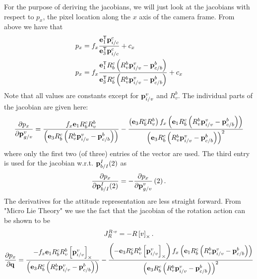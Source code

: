 For the purpose of deriving the jacobians, we will just look at the jacobians
with respect to $p_x$, the pixel location along the $x$ axis of the camera
frame. From above we have that
\begin{align}
  p_x &= f_x \frac{\boldsymbol{\mathrm{e}}_1^{\mathsf{T}} \boldsymbol{\mathrm{p}}_{i/c}^c}{\boldsymbol{\mathrm{e}}_3^{\mathsf{T}} \boldsymbol{\mathrm{p}}_{i/c}^c} + c_x \\ 
  p_x &= f_x \frac{\boldsymbol{\mathrm{e}}_1^{\mathsf{T}} R_b^c \left(R_v^b \boldsymbol{\mathrm{p}}_{i/v}^v -
      \boldsymbol{\mathrm{p}}_{c/b}^b\right) }{\boldsymbol{\mathrm{e}}_3^{\mathsf{T}} R_b^c \left(R_v^b \boldsymbol{\mathrm{p}}_{i/v}^v -
  \boldsymbol{\mathrm{p}}_{c/b}^b\right) } + c_x 
\end{align}
Note that all values are constants except for $\boldsymbol{\mathrm{p}}_{i/v}^v$ and $R_v^b$.
The individual parts of the jacobian are given here:
\begin{equation}
  \frac{\partial p_x}{\partial \boldsymbol{\mathrm{p}}_{g/v}^v} =
  \frac{f_x \boldsymbol{\mathrm{e}}_1 R_b^c R_v^b}
    {\left(\boldsymbol{\mathrm{e}}_3 R_b^c \left(R_v^b \boldsymbol{\mathrm{p}}_{i/v}^v -
    \boldsymbol{\mathrm{p}}_{c/b}^b\right)\right)}
    - \frac{\left(\boldsymbol{\mathrm{e}}_3 R_b^c R_v^b \right) f_x \left(\boldsymbol{\mathrm{e}}_1 R_b^c \left(R_v^b \boldsymbol{\mathrm{p}}_{i/v}^v -
        \boldsymbol{\mathrm{p}}_{c/b}^b\right)\right)} {\left(\boldsymbol{\mathrm{e}}_3 R_b^c \left(R_v^b \boldsymbol{\mathrm{p}}_{i/v}^v -
  \boldsymbol{\mathrm{p}}_{c/b}^b\right)\right)^2}
\end{equation}
where only the first two (of three) entries of the vector are used. The third
entry is used for the jacobian w.r.t. $\boldsymbol{\mathrm{p}}_{b/I}^I(2)$ as
\begin{equation}
  \frac{\partial p_x}{\partial \boldsymbol{\mathrm{p}}_{b/I}^I(2)} = -\frac{\partial p_x}{\partial
  \boldsymbol{\mathrm{p}}_{g/v}^v}\left(2\right).
\end{equation}
The derivatives for the attitude representation are less straight forward. From
"Micro Lie Theory" we use the fact that the jacobian of the rotation action can
be shown to be
\begin{equation}
  J_R^{R \cdot v} = -R \left[ v \right]_{\times}.
\end{equation}
\begin{equation}
  \frac{\partial p_x}{\partial \boldsymbol{\mathrm{q}}} =
  \frac{-f_x \boldsymbol{\mathrm{e}}_1 R_b^c R_v^b \left[ \boldsymbol{\mathrm{p}}_{i/v}^v \right]_{\times}}
    {\left(\boldsymbol{\mathrm{e}}_3 R_b^c \left(R_v^b \boldsymbol{\mathrm{p}}_{i/v}^v -
    \boldsymbol{\mathrm{p}}_{c/b}^b\right)\right)}
    - \frac{\left(-\boldsymbol{\mathrm{e}}_3 R_b^c R_v^b \left[ \boldsymbol{\mathrm{p}}_{i/v}^v \right]_{\times} \right) f_x \left(\boldsymbol{\mathrm{e}}_1 R_b^c \left(R_v^b \boldsymbol{\mathrm{p}}_{i/v}^v -
        \boldsymbol{\mathrm{p}}_{c/b}^b\right)\right)} {\left(\boldsymbol{\mathrm{e}}_3 R_b^c \left(R_v^b \boldsymbol{\mathrm{p}}_{i/v}^v -
  \boldsymbol{\mathrm{p}}_{c/b}^b\right)\right)^2}
\end{equation}
